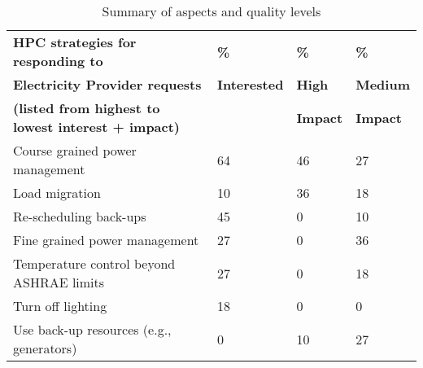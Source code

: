 \begin{table}[htbp]
\begin{center}
\caption{Summary of aspects and quality levels}
\begin{tabular}{|p{2.5in}|p{0.75in}|p{0.75in}|p{0.75in}|} \hline

\textbf{HPC strategies for responding to} &
\textbf{\%} &
\textbf{\%} &
\textbf{\%} \\

\textbf{Electricity Provider requests} &
\textbf{Interested} &
\textbf{High} &
\textbf{Medium} \\

\textbf{(listed from highest to lowest interest + impact)} &
 &
\textbf{Impact} & 
\textbf{Impact} \\
\hline

Course grained power management &
64 &
46 &
27 \\

Load migration &
10 &
36 &
18 \\
\hline

Re-scheduling back-ups &
45 &
0 &
10 \\
\hline

Fine grained power management &
27 &
0 &
36 \\
\hline

Temperature control beyond ASHRAE limits &
27 &
0 &
18 \\
\hline

Turn off lighting &
18 &
0 &
0 \\
\hline

Use back-up resources (e.g., generators) &
0 &
10 &
27 \\
\hline

\end{tabular}
\label{tab3}
\end{center}

\end{table}


%

